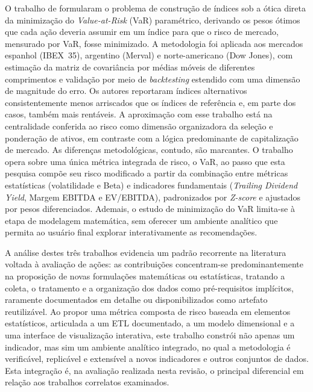 O trabalho de  formularam o problema de construção de índices sob a ótica direta da minimização do \textit{Value-at-Risk} (VaR) paramétrico, derivando os pesos ótimos que cada ação deveria assumir em um índice para que o risco de mercado, mensurado por VaR, fosse minimizado. A metodologia foi aplicada aos mercados espanhol (IBEX~35), argentino (Merval) e norte-americano (Dow Jones), com estimação da matriz de covariância por médias móveis de diferentes comprimentos e validação por meio de \textit{backtesting} estendido com uma dimensão de magnitude do erro. Os autores reportaram índices alternativos consistentemente menos arriscados que os índices de referência e, em parte dos casos, também mais rentáveis. A aproximação com esse trabalho está na centralidade conferida ao risco como dimensão organizadora da seleção e ponderação de ativos, em contraste com a lógica predominante de capitalização de mercado. As diferenças metodológicas, contudo, são marcantes. O trabalho  opera sobre uma única métrica integrada de risco, o VaR, ao passo que esta pesquisa compõe seu risco modificado a partir da combinação entre métricas estatísticas (volatilidade e Beta) e indicadores fundamentais (\textit{Trailing Dividend Yield}, Margem EBITDA e EV/EBITDA), padronizados por \textit{Z-score} e ajustados por pesos diferenciados. Ademais, o estudo de minimização do VaR limita-se à etapa de modelagem matemática, sem oferecer um ambiente analítico que permita ao usuário final explorar interativamente as recomendações.


A análise destes três trabalhos evidencia um padrão recorrente na literatura voltada à avaliação de ações: as contribuições concentram-se predominantemente na proposição de novas formulações matemáticas ou estatísticas, tratando a coleta, o tratamento e a organização dos dados como pré-requisitos implícitos, raramente documentados em detalhe ou disponibilizados como artefato reutilizável. Ao propor uma métrica composta de risco baseada em elementos estatísticos, articulada a um ETL documentado, a um modelo dimensional e a uma interface de visualização interativa, este trabalho constrói não apenas um indicador, mas sim um ambiente analítico integrado, no qual a metodologia é verificável, replicável e extensível a novos indicadores e outros conjuntos de dados. Esta integração é, na avaliação realizada nesta revisão, o principal diferencial em relação aos trabalhos correlatos examinados.


